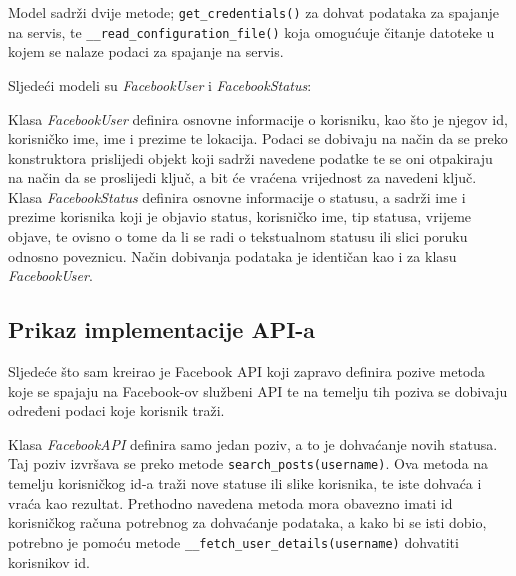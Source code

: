 \documentclass[a4paper,12pt]{foi}
\begin{document}
Model sadrži dvije metode; \texttt{get\_credentials()} za dohvat podataka za spajanje na servis, te \texttt{\_\_read\_configuration\_file()} koja omogućuje čitanje datoteke u kojem se nalaze podaci za spajanje na servis.

Sljedeći modeli su \textit{FacebookUser} i \textit{FacebookStatus}:

\lstset{commentstyle=\textit,language=python}


Klasa \textit{FacebookUser} definira osnovne informacije o korisniku, kao što je njegov id, korisničko ime, ime i prezime te lokacija. Podaci se dobivaju na način da se preko konstruktora prislijedi objekt koji sadrži navedene podatke te se oni otpakiraju na način da se proslijedi ključ, a bit će vraćena vrijednost za navedeni ključ. Klasa \textit{FacebookStatus} definira osnovne informacije o statusu, a sadrži ime i prezime korisnika koji je objavio status, korisničko ime, tip statusa, vrijeme objave, te ovisno o tome da li se radi o tekstualnom statusu ili slici poruku odnosno poveznicu. Način dobivanja podataka je identičan kao i za klasu \textit{FacebookUser}.

\subsection{Prikaz implementacije API-a}

Sljedeće što sam kreirao je Facebook API koji zapravo definira pozive metoda koje se spajaju na Facebook-ov službeni API te na temelju tih poziva se dobivaju određeni podaci koje korisnik traži.

\lstset{commentstyle=\textit,language=python}


Klasa \textit{FacebookAPI} definira samo jedan poziv, a to je dohvaćanje novih statusa. Taj poziv izvršava se preko metode \texttt{search\_posts(username)}. Ova metoda na temelju korisničkog id-a traži nove statuse ili slike korisnika, te iste dohvaća i vraća kao rezultat. Prethodno navedena metoda mora obavezno imati id korisničkog računa potrebnog za dohvaćanje podataka, a kako bi se isti dobio, potrebno je pomoću metode \texttt{\_\_fetch\_user\_details(username)} dohvatiti korisnikov id.
\end{document}
